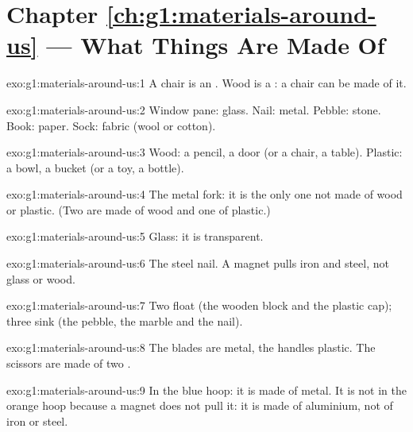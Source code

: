 \section*{Chapter \ref{ch:g1:materials-around-us} --- What Things Are Made Of}

\begin{solution}{exo:g1:materials-around-us:1}
A chair is an . Wood is a : a chair can be made of it.
\end{solution}

\begin{solution}{exo:g1:materials-around-us:2}
Window pane: glass. Nail: metal. Pebble: stone. Book: paper. Sock:
fabric (wool or cotton).
\end{solution}

\begin{solution}{exo:g1:materials-around-us:3}
Wood: a pencil, a door (or a chair, a table). Plastic: a bowl, a bucket
(or a toy, a bottle).
\end{solution}

\begin{solution}{exo:g1:materials-around-us:4}
The metal fork: it is the only one not made of wood or plastic. (Two are
made of wood and one of plastic.)
\end{solution}

\begin{solution}{exo:g1:materials-around-us:5}
Glass: it is transparent.
\end{solution}

\begin{solution}{exo:g1:materials-around-us:6}
The steel nail. A magnet pulls iron and steel, not glass or wood.
\end{solution}

\begin{solution}{exo:g1:materials-around-us:7}
Two  float (the wooden block and the plastic cap); three sink
(the pebble, the marble and the nail).
\end{solution}

\begin{solution}{exo:g1:materials-around-us:8}
The blades are metal, the handles plastic. The scissors are made of two
.
\end{solution}

\begin{solution}{exo:g1:materials-around-us:9}
In the blue hoop: it is made of metal. It is not in the orange hoop
because a magnet does not pull it: it is made of aluminium, not of iron
or steel.
\end{solution}

